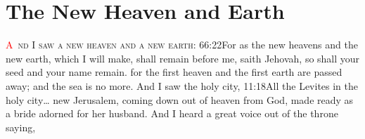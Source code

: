 
\chapter{The New Heaven and Earth}
\fancyhead{} %
\lettrine[lines=3,slope=0.5em]{\textcolor{red}{A}}{\ nd I saw a new heaven and a new earth:}%
				{66:22}{For as the new heavens and the new earth, which I will make, shall remain before me, saith Jehovah, so shall your seed and your name remain.} %
for the first heaven and the first earth are passed away; and the sea is no more. 
And I saw the holy city,%
					{11:18}{All the Levites in the holy city\ldots} %
new Jerusalem, coming down out of heaven from God, made ready as a bride adorned for her husband.%
And I heard a great voice out of the throne saying,
